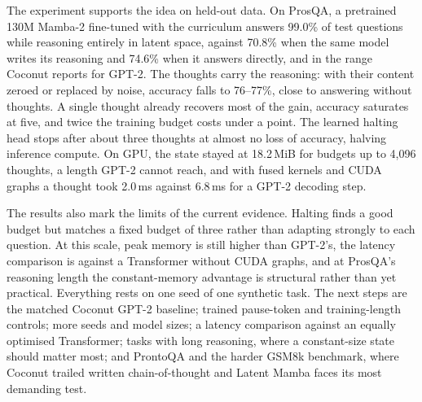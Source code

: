 \documentclass[10pt]{article}
\begin{document}
The experiment supports the idea on held-out data. On ProsQA, a pretrained 130M Mamba-2 fine-tuned with the curriculum answers 99.0\% of test questions while reasoning entirely in latent space, against 70.8\% when the same model writes its reasoning and 74.6\% when it answers directly, and in the range Coconut reports for GPT-2. The thoughts carry the reasoning: with their content zeroed or replaced by noise, accuracy falls to 76--77\%, close to answering without thoughts. A single thought already recovers most of the gain, accuracy saturates at five, and twice the training budget costs under a point. The learned halting head stops after about three thoughts at almost no loss of accuracy, halving inference compute. On GPU, the state stayed at 18.2\,MiB for budgets up to 4{,}096 thoughts, a length GPT-2 cannot reach, and with fused kernels and CUDA graphs a thought took 2.0\,ms against 6.8\,ms for a GPT-2 decoding step.

The results also mark the limits of the current evidence. Halting finds a good budget but matches a fixed budget of three rather than adapting strongly to each question. At this scale, peak memory is still higher than GPT-2's, the latency comparison is against a Transformer without CUDA graphs, and at ProsQA's reasoning length the constant-memory advantage is structural rather than yet practical. Everything rests on one seed of one synthetic task. The next steps are the matched Coconut GPT-2 baseline; trained pause-token and training-length controls; more seeds and model sizes; a latency comparison against an equally optimised Transformer; tasks with long reasoning, where a constant-size state should matter most; and ProntoQA and the harder GSM8k benchmark, where Coconut trailed written chain-of-thought and Latent Mamba faces its most demanding test.
\end{document}
